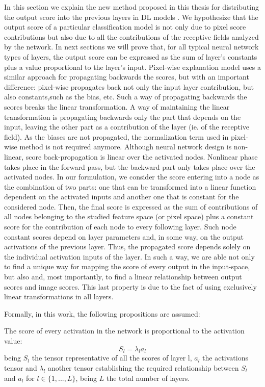 In this section we explain the new method proposed in this thesis for distributing the output score into the previous layers in DL models \citep{de2017deep}. We hypothesize that the output score of a particular classification model is not only due to pixel score contributions but also due to all the contributions of the receptive fields analyzed by the network. In next sections we will prove that, for all typical neural network types of layers, the output score can be expressed as the sum of layer's constants plus a value proportional to the layer's input. Pixel-wise explanation model uses a similar approach for propagating backwards the scores, but with an important difference: pixel-wise \citep{bach2015pixel} propagates back not only the input layer contribution, but also constants,such as the bias, etc. Such a way of propagating backwards the scores breaks the linear transformation. A way of maintaining the linear transformation is propagating backwards only the part that depends on the input, leaving the other part as a contribution of the layer (ie. of the receptive field). As the biases are not propagated, the normalization term used in pixel-wise method is not required anymore. Although neural network design is non-linear, score back-propagation is linear over the activated nodes. Nonlinear phase takes place in the forward pass, but the backward part only takes place over the activated nodes. In our formulation, we consider the score entering into a node as the combination of two parts: one that can be transformed into a linear function dependent on the activated inputs and another one that is constant for the considered node. Then, the final score is expressed as the sum of contributions of all nodes belonging to the studied feature space (or pixel space) plus a constant score for the contribution of each node to every following layer.
Such node constant scores depend on layer parameters and, in some way, on the output activations of the previous layer. Thus, the propagated score depends solely on the individual activation inputs of the layer. In such a way, we are able not only to find a unique way for mapping the score of every output in the input-space, but also and, most importantly, to find a linear relationship between output scores and image scores. This last property is due to the fact of using exclusively linear transformations in all layers.

Formally, in this work, the following propositions are assumed:

\begin{proposition}
	The score of every activation in the network is proportional to the activation value:
	\begin{equation}
	S_l = \lambda_l a_{l}
	\end{equation}
	being $S_l$ the tensor representative of all the scores of layer l, $a_l$ the activations tensor and $\lambda_l$ another tensor establishing the required relationship between $S_l$ and $a_l$ for $l \in \{1, ..., L\}$, being $L$ the total number of layers.
\end{proposition}

